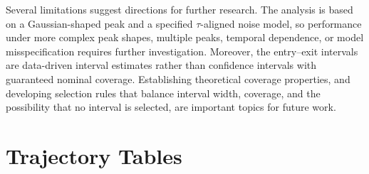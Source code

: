 \documentclass[12pt,a4paper]{article}
\begin{document}
Several limitations suggest directions for further research. The
analysis is based on a Gaussian-shaped peak and a specified
$\tau$-aligned noise model, so performance under more complex peak
shapes, multiple peaks, temporal dependence, or model misspecification
requires further investigation. Moreover, the entry--exit intervals
are data-driven interval estimates rather than confidence intervals
with guaranteed nominal coverage. Establishing theoretical coverage
properties, and developing selection rules that balance interval width,
coverage, and the possibility that no interval is selected, are
important topics for future work.

\appendix

\section{Trajectory Tables}
\label{app:trajectories}
\end{document}
